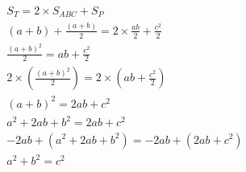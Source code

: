 $$
\begin{align}
 S_T = 2 \times S_{ABC} + S_P \\[1em]
(a+b) + \frac{(a+b)}{2} = 2 \times \frac{ab}{2} + \frac{c^2}{2} \\
\frac{(a+b)^2}{2} = ab + \frac{c^2}{2} \\
2 \times (\frac{(a+b)^2}{2}) = 2 \times (ab + \frac{c^2}{2}) \\
(a+b)^2 = 2ab + c^2 \\
a^2 + 2ab + b^2 = 2ab + c^2 \\
-2ab + (a^2 + 2ab + b^2) = -2ab + (2ab + c^2) \\[1em]
\boxed{a^2 + b^2 = c^2}
\end{align}
$$